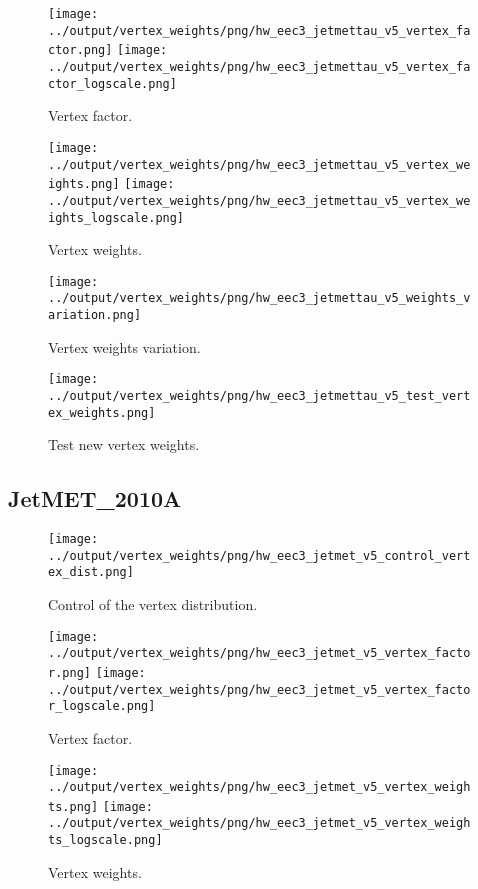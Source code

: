 \documentclass[11pt]{book}
\begin{document}
\begin{figure}[ht]
\centering
\texttt{[image: ../output/vertex\_weights/png/hw\_eec3\_jetmettau\_v5\_vertex\_factor.png]}
\texttt{[image: ../output/vertex\_weights/png/hw\_eec3\_jetmettau\_v5\_vertex\_factor\_logscale.png]}
\caption{Vertex factor.}
\end{figure}

\begin{figure}[ht]
\centering
\texttt{[image: ../output/vertex\_weights/png/hw\_eec3\_jetmettau\_v5\_vertex\_weights.png]}
\texttt{[image: ../output/vertex\_weights/png/hw\_eec3\_jetmettau\_v5\_vertex\_weights\_logscale.png]}
\caption{Vertex weights.}
\end{figure}

\begin{figure}[ht]
\centering
\texttt{[image: ../output/vertex\_weights/png/hw\_eec3\_jetmettau\_v5\_weights\_variation.png]}
\caption{Vertex weights variation.}
\end{figure}

\begin{figure}[ht]
\centering
\texttt{[image: ../output/vertex\_weights/png/hw\_eec3\_jetmettau\_v5\_test\_vertex\_weights.png]}
\caption{Test new vertex weights.}
\end{figure}
\clearpage

\subsection{JetMET\_2010A}
\begin{figure}[ht]
\centering
\texttt{[image: ../output/vertex\_weights/png/hw\_eec3\_jetmet\_v5\_control\_vertex\_dist.png]}
\caption{Control of the vertex distribution.}
\end{figure}

\begin{figure}[ht]
\centering
\texttt{[image: ../output/vertex\_weights/png/hw\_eec3\_jetmet\_v5\_vertex\_factor.png]}
\texttt{[image: ../output/vertex\_weights/png/hw\_eec3\_jetmet\_v5\_vertex\_factor\_logscale.png]}
\caption{Vertex factor.}
\end{figure}

\begin{figure}[ht]
\centering
\texttt{[image: ../output/vertex\_weights/png/hw\_eec3\_jetmet\_v5\_vertex\_weights.png]}
\texttt{[image: ../output/vertex\_weights/png/hw\_eec3\_jetmet\_v5\_vertex\_weights\_logscale.png]}
\caption{Vertex weights.}
\end{figure}
\end{document}
